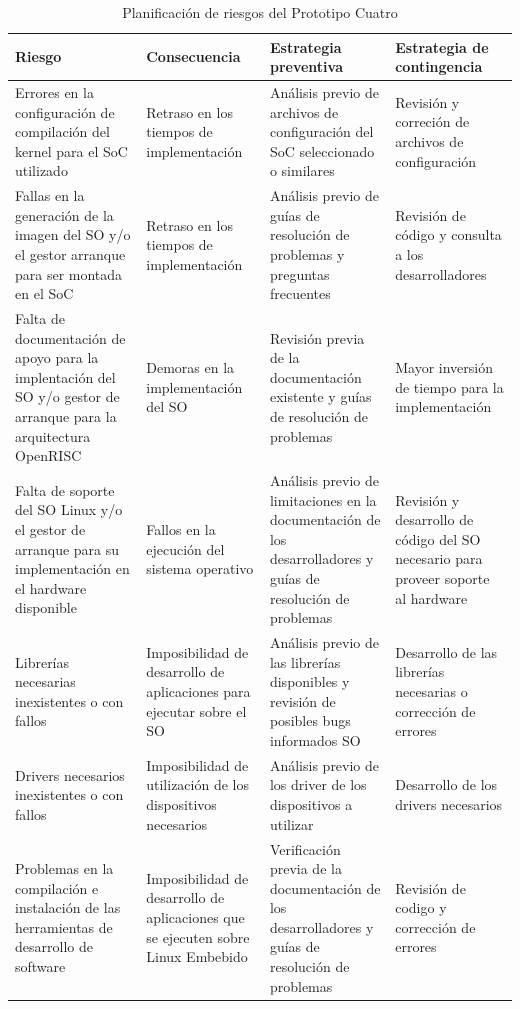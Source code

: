  		\begin{table}[h!]
		\centering
		\begin{tabular}{ p{4cm} p{4cm} p{4cm} p{3cm} }
		\hline 
		\rowcolor[gray]{0.8} Riesgo & Consecuencia & Estrategia preventiva & Estrategia de contingencia\\
		\hline Errores en la configuración de compilación del kernel para el SoC utilizado & 
		       Retraso en los tiempos de implementación & 
		       Análisis previo de archivos de configuración del SoC seleccionado o similares & 
		       Revisión y correción de archivos de configuración\\
		\hline Fallas en la generación de la imagen del SO y/o el gestor arranque para ser montada en el SoC & 
		       Retraso en los tiempos de implementación & 
		       Análisis previo de guías de resolución de problemas y preguntas frecuentes & 
		       Revisión de código y consulta a los desarrolladores\\
		\hline Falta de documentación de apoyo para la implentación del SO y/o gestor de arranque para la arquitectura OpenRISC & 
		       Demoras en la implementación del SO & 
		       Revisión previa de la documentación existente y guías de resolución de problemas & 
		       Mayor inversión de tiempo para la implementación\\
		\hline Falta de soporte del SO Linux y/o el gestor de arranque para su implementación en el hardware disponible & 
			   Fallos en la ejecución del sistema operativo & 
		       Análisis previo de limitaciones en la documentación de los desarrolladores y guías de resolución de problemas & 
		       Revisión y desarrollo de código del SO necesario para proveer soporte al hardware\\
		\hline Librerías necesarias inexistentes o con fallos & 
			   Imposibilidad de desarrollo de aplicaciones para ejecutar sobre el SO &
			   Análisis previo de las librerías disponibles y revisión de posibles bugs informados SO & 
			   Desarrollo de las librerías necesarias o corrección de errores\\
		\hline Drivers necesarios inexistentes o con fallos & 
			   Imposibilidad de utilización de los dispositivos necesarios & 
			   Análisis previo de los driver de los dispositivos a utilizar & 
			   Desarrollo de los drivers necesarios\\		
		\hline Problemas en la compilación e instalación de las herramientas de desarrollo de software & 
			   Imposibilidad de desarrollo de aplicaciones que se ejecuten sobre Linux Embebido & 
			   Verificación previa de la documentación de los desarrolladores y guías de resolución de problemas & 
			   Revisión de codigo y corrección de errores\\
		\hline
		\end{tabular}
		\caption{Planificación de riesgos del Prototipo Cuatro}
		\end{table}

